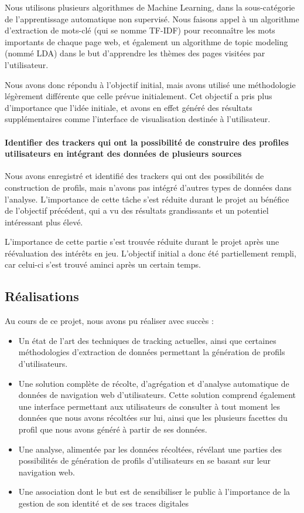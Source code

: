 		Nous utilisons plusieurs algorithmes de Machine Learning, dans la sous-catégorie de l'apprentissage automatique non supervisé. Nous faisons appel à un algorithme d'extraction de mots-clé (qui se nomme \gls{TF-IDF}) pour reconnaître les mots importants de chaque page web, et également un algorithme de topic modeling (nommé \gls{LDA}) dans le but d'apprendre les thèmes des pages visitées par l'utilisateur.
	
		Nous avons donc répondu à l'objectif initial, mais avons utilisé une méthodologie légèrement différente que celle prévue initialement. Cet objectif a pris plus d'importance que l'idée initiale, et avons en effet généré des résultats supplémentaires comme l'interface de visualisation destinée à l'utilisateur.

	\paragraph{Identifier des trackers qui ont la possibilité de construire des profiles utilisateurs en intégrant des données de plusieurs sources}

		Nous avons enregistré et identifié des trackers qui ont des possibilités de construction de profils, mais n'avons pas intégré d'autres types de données dans l'analyse. L'importance de cette tâche s'est réduite durant le projet au bénéfice de l'objectif précédent, qui a vu des résultats grandissants et un potentiel intéressant plus élevé.

		L'importance de cette partie s'est trouvée réduite durant le projet après une réévaluation des intérêts en jeu. L'objectif initial a donc été partiellement rempli, car celui-ci s'est trouvé aminci après un certain temps.

	\subsection{Réalisations}

		Au cours de ce projet, nous avons pu réaliser avec succès :
		\begin{itemize}
			\item Un état de l'art des techniques de tracking actuelles, ainsi que certaines méthodologies d'extraction de données permettant la génération de profils d'utilisateurs.
			\item Une solution complète de récolte, d'agrégation et d'analyse automatique de données de navigation web d'utilisateurs. Cette solution comprend également une interface permettant aux utilisateurs de consulter à tout moment les données que nous avons récoltées sur lui, ainsi que les plusieurs facettes du profil que nous avons généré à partir de ses données.
			\item Une analyse, alimentée par les données récoltées, révélant une parties des possibilités de génération de profils d'utilisateurs en se basant sur leur navigation web.
			\item Une association dont le but est de sensibiliser le public à l'importance de la gestion de son identité et de ses traces digitales
		\end{itemize}

